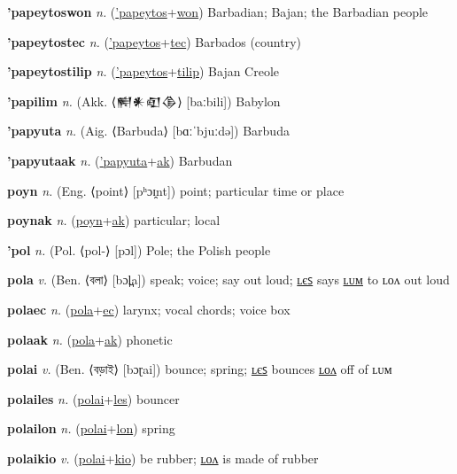 \textbf{\hypertarget{'papeytoswon}{'papeytoswon}} \textit{n.} (\hyperlink{'papeytos}{'papeytos}+\allowbreak \hyperlink{won}{won})
Barbadian; Bajan; the Barbadian people

\textbf{\hypertarget{'papeytostec}{'papeytostec}} \textit{n.} (\hyperlink{'papeytos}{'papeytos}+\allowbreak \hyperlink{tec}{tec})
Barbados (country)

\textbf{\hypertarget{'papeytostilip}{'papeytostilip}} \textit{n.} (\hyperlink{'papeytos}{'papeytos}+\allowbreak \hyperlink{tilip}{tilip})
Bajan Creole

\textbf{\hypertarget{'papilim}{'papilim}} \textit{n.} (Akk. ⟨{\cuneiform{}𒆍𒀭𒊏𒆠}⟩ [baːbili])
Babylon

\textbf{\hypertarget{'papyuta}{'papyuta}} \textit{n.} (Aig. ⟨Barbuda⟩ [bɑːˈbjuːdə])
Barbuda

\textbf{\hypertarget{'papyutaak}{'papyutaak}} \textit{n.} (\hyperlink{'papyuta}{'papyuta}+\allowbreak \hyperlink{ak}{ak})
Barbudan

\textbf{\hypertarget{poyn}{poyn}} \textit{n.} (Eng. ⟨point⟩ [pʰɔɪ̯nt])
point; particular time or place

\textbf{\hypertarget{poynak}{poynak}} \textit{n.} (\hyperlink{poyn}{poyn}+\allowbreak \hyperlink{ak}{ak})
particular; local

\textbf{\hypertarget{'pol}{'pol}} \textit{n.} (Pol. ⟨pol-⟩ [pɔl])
Pole; the Polish people

\textbf{\hypertarget{pola}{pola}} \textit{v.} (Ben. ⟨{\bengali{}বলা}⟩ [bɔl̪a])
speak; voice; say out loud; \hyperlink{polales}{ʟєꜱ} says \hyperlink{polalum}{ʟᴜᴍ} to ʟᴏᴧ out loud

\textbf{\hypertarget{polaec}{polaec}} \textit{n.} (\hyperlink{pola}{pola}+\allowbreak \hyperlink{ec}{ec})
larynx; vocal chords; voice box

\textbf{\hypertarget{polaak}{polaak}} \textit{n.} (\hyperlink{pola}{pola}+\allowbreak \hyperlink{ak}{ak})
phonetic

\textbf{\hypertarget{polai}{polai}} \textit{v.} (Ben. ⟨{\bengali{}বড়াই}⟩ [bɔɽai])
bounce; spring; \hyperlink{polailes}{ʟєꜱ} bounces \hyperlink{polailon}{ʟᴏᴧ} off of ʟᴜᴍ

\textbf{\hypertarget{polailes}{polailes}} \textit{n.} (\hyperlink{polai}{polai}+\allowbreak \hyperlink{les}{les})
bouncer

\textbf{\hypertarget{polailon}{polailon}} \textit{n.} (\hyperlink{polai}{polai}+\allowbreak \hyperlink{lon}{lon})
spring

\textbf{\hypertarget{polaikio}{polaikio}} \textit{v.} (\hyperlink{polai}{polai}+\allowbreak \hyperlink{kio}{kio})
be rubber; \hyperlink{polaikiolon}{ʟᴏᴧ} is made of rubber

